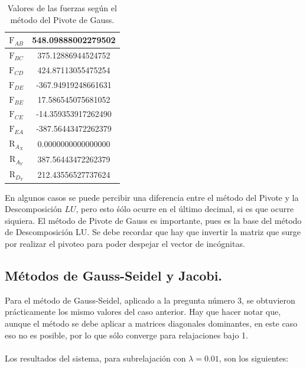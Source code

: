 \documentclass[12pt, notitlepage]{article}
\begin{document}
\begin{table}[H]
\centering
\caption{Valores de las fuerzas según el método del Pivote de Gauss.}
\begin{tabular}{|c|c|} \hline
$\text{F}_{AB}$ & 548.09888002279502 \\ \hline
$\text{F}_{BC}$ & 375.12886944524752 \\ \hline
$\text{F}_{CD}$ & 424.87113055475254 \\ \hline
$\text{F}_{DE}$ & -367.94919248661631 \\ \hline
$\text{F}_{BE}$ & 17.586545075681052 \\ \hline
$\text{F}_{CE}$ & -14.359353917262490 \\ \hline
$\text{F}_{EA}$ & -387.56443472262379 \\ \hline
$\text{R}_{A_X}$ & 0.0000000000000000 \\ \hline
$\text{R}_{A_Y}$ & 387.56443472262379 \\ \hline
$\text{R}_{D_Y}$ & 212.43556527737624 \\ \hline
\end{tabular}
\end{table}

En algunos casos se puede percibir una diferencia entre el método del Pivote y la Descomposición $LU$, pero esto śólo ocurre en el último decimal, si es que ocurre siquiera. El método de Pivote de Gauss es importante, pues es la base del método de Descomposición LU. Se debe recordar que hay que invertir la matriz que surge por realizar el pivoteo para poder despejar el vector de incógnitas.

\newpage

\subsection{Métodos de Gauss-Seidel y Jacobi.}

Para el método de Gauss-Seidel, aplicado a la pregunta número 3, se obtuvieron prácticamente los mismo valores del caso anterior. Hay que hacer notar que, aunque el método se debe aplicar a matrices diagonales dominantes, en este caso eso no es posible, por lo que sólo converge para relajaciones bajo 1.\\\\
Los resultados del sistema, para subrelajación con $\lambda = 0.01$, son los siguientes:
\end{document}
